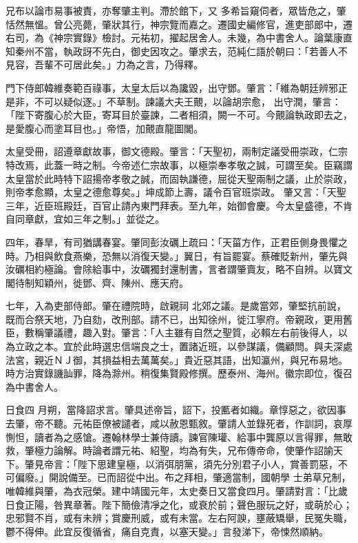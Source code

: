 \begin{pinyinscope}
 兄布以論市易事被責，亦奪肇主判。滯於館下，又
 多希旨窺伺者，眾皆危之，肇恬然無慍。曾公亮薨，肇狀其行，神宗覽而嘉之。遷國史編修官，進吏部郎中，遷右司，為《神宗實錄》檢討。元祐初，擢起居舍人。未幾，為中書舍人。論葉康直知秦州不當，執政訝不先白，御史因攻之。肇求去，范純仁語於朝曰：「若善人不見容，吾輩不可居此矣。」力為之言，乃得釋。



 門下侍郎韓維奏範百祿事，太皇太后以為讒毀，出守鄧。肇言：「維為朝廷辨邪正是非，不可以疑似逐。」不草制。諫議大夫王覿，以論胡宗愈，
 出守潤，肇言：「陛下寄腹心於大臣，寄耳目於臺諫，二者相須，闕一不可。今覿論執政即去之，是愛腹心而塗耳目也。」帝悟，加覿直龍圖閣。



 太皇受冊，詔遵章獻故事，御文德殿。肇言：「天聖初，兩制定議受冊崇政，仁宗特改焉，此蓋一時之制。今帝述仁宗故事，以極崇奉孝敬之誠，可謂至矣。臣竊謂太皇當於此時特下詔揚帝孝敬之誠，而固執謙德，屈從天聖兩制之議，止於崇政，則帝孝愈顯，太皇之德愈尊矣。」坤成節上壽，議令百官班崇政。
 肇又言：「天聖三年，近臣班殿廷，百官止請內東門拜表。至九年，始御會慶。今太皇盛德，不肯自同章獻，宜如三年之制。」並從之。



 四年，春旱，有司猶講春宴。肇同彭汝礪上疏曰：「天菑方作，正君臣側身畏懼之時。乃相與飲食燕樂，恐無以消復天變。」翼日，有旨罷宴。蔡確貶新州，肇先與汝礪相約極論。會除給事中，汝礪獨封還制書，言者謂肇賣友，略不自辨。以寶文閣待制知穎州，徙鄧、齊、陳州、應天府。



 七年，入為吏部侍郎。肇在禮院時，啟親祠
 北郊之議。是歲當郊，肇堅抗前說，既而合祭天地，乃自劾，改刑部。請不已，出知徐州，徙江寧府。帝親政，更用舊臣，數稱肇議禮，趣入對。肇言：「人主雖有自然之聖質，必賴左右前後得人，以為立政之本。宜於此時選忠信端良之士，置諸近班，以參謀議，備顧問。與夫深處法宮，親近ＮＪ御，其損益相去萬萬矣。」貴近惡其語，出知瀛州，與兄布易地。時方治實錄譏訕罪，降為滁州。稍復集賢殿修撰。歷泰州、海州。徽宗即位，復召為中書舍人。



 日食四
 月朔，當降詔求言。肇具述帝旨，詔下，投匭者如織。章惇惡之，欲因事去肇，帝不聽。元祐臣僚被譴者，咸以赦恩甄敘。肇請人並錄死者，作訓詞，哀厚惻怛，讀者為之感愴。遷翰林學士兼侍讀。諫官陳瓘、給事中龔原以言得罪，無敢救，肇極力論解。時論者謂元祐、紹聖，均為有失，兄布傳帝命，使肇作詔諭天下。肇見帝言：「陛下思建皇極，以消弭朋黨，須先分別君子小人，賞善罰惡，不可偏廢。」開說備至。已而詔從中出。布之拜相，肇適當制，國朝學
 士弟草兄制，唯韓維與肇，為衣冠榮。建中靖國元年，太史奏日又當食四月。肇請對言：「比歲日食正陽，咎異章著。陛下簡儉清凈之化，或衰於前；聲色服玩之好，或萌於心；忠邪賢不肖，或有未辨；賞慶刑威，或有未當。左右阿諛，壅蔽矯舉，民冤失職，鬱不得伸。此宜反復循省，痛自克責，以塞天變。」言發涕下，帝悚然順納。




\end{pinyinscope}
